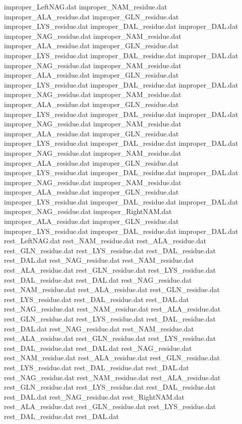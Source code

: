 improper_LeftNAG.dat
improper_NAM_residue.dat
improper_ALA_residue.dat
improper_GLN_residue.dat
improper_LYS_residue.dat
improper_DAL_residue.dat
improper_DAL.dat
improper_NAG_residue.dat
improper_NAM_residue.dat
improper_ALA_residue.dat
improper_GLN_residue.dat
improper_LYS_residue.dat
improper_DAL_residue.dat
improper_DAL.dat
improper_NAG_residue.dat
improper_NAM_residue.dat
improper_ALA_residue.dat
improper_GLN_residue.dat
improper_LYS_residue.dat
improper_DAL_residue.dat
improper_DAL.dat
improper_NAG_residue.dat
improper_NAM_residue.dat
improper_ALA_residue.dat
improper_GLN_residue.dat
improper_LYS_residue.dat
improper_DAL_residue.dat
improper_DAL.dat
improper_NAG_residue.dat
improper_NAM_residue.dat
improper_ALA_residue.dat
improper_GLN_residue.dat
improper_LYS_residue.dat
improper_DAL_residue.dat
improper_DAL.dat
improper_NAG_residue.dat
improper_NAM_residue.dat
improper_ALA_residue.dat
improper_GLN_residue.dat
improper_LYS_residue.dat
improper_DAL_residue.dat
improper_DAL.dat
improper_NAG_residue.dat
improper_NAM_residue.dat
improper_ALA_residue.dat
improper_GLN_residue.dat
improper_LYS_residue.dat
improper_DAL_residue.dat
improper_DAL.dat
improper_NAG_residue.dat
improper_RightNAM.dat
improper_ALA_residue.dat
improper_GLN_residue.dat
improper_LYS_residue.dat
improper_DAL_residue.dat
improper_DAL.dat
rest_LeftNAG.dat
rest_NAM_residue.dat
rest_ALA_residue.dat
rest_GLN_residue.dat
rest_LYS_residue.dat
rest_DAL_residue.dat
rest_DAL.dat
rest_NAG_residue.dat
rest_NAM_residue.dat
rest_ALA_residue.dat
rest_GLN_residue.dat
rest_LYS_residue.dat
rest_DAL_residue.dat
rest_DAL.dat
rest_NAG_residue.dat
rest_NAM_residue.dat
rest_ALA_residue.dat
rest_GLN_residue.dat
rest_LYS_residue.dat
rest_DAL_residue.dat
rest_DAL.dat
rest_NAG_residue.dat
rest_NAM_residue.dat
rest_ALA_residue.dat
rest_GLN_residue.dat
rest_LYS_residue.dat
rest_DAL_residue.dat
rest_DAL.dat
rest_NAG_residue.dat
rest_NAM_residue.dat
rest_ALA_residue.dat
rest_GLN_residue.dat
rest_LYS_residue.dat
rest_DAL_residue.dat
rest_DAL.dat
rest_NAG_residue.dat
rest_NAM_residue.dat
rest_ALA_residue.dat
rest_GLN_residue.dat
rest_LYS_residue.dat
rest_DAL_residue.dat
rest_DAL.dat
rest_NAG_residue.dat
rest_NAM_residue.dat
rest_ALA_residue.dat
rest_GLN_residue.dat
rest_LYS_residue.dat
rest_DAL_residue.dat
rest_DAL.dat
rest_NAG_residue.dat
rest_RightNAM.dat
rest_ALA_residue.dat
rest_GLN_residue.dat
rest_LYS_residue.dat
rest_DAL_residue.dat
rest_DAL.dat
